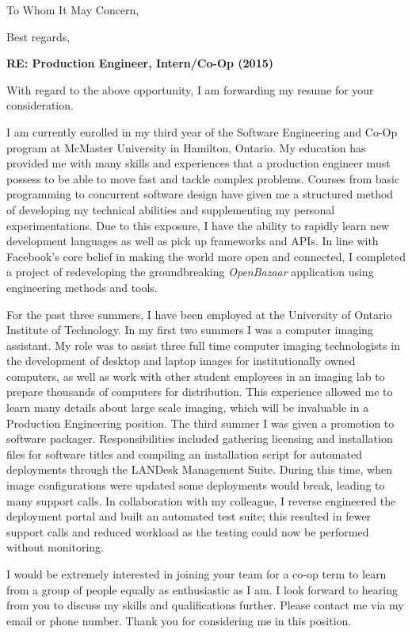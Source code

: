 \documentclass[11pt,a4paper,sans]{moderncv}        %
\begin{document}
\date{January 24th, 2016}
\opening{To Whom It May Concern,}
\closing{Best regards,}
\makelettertitle

\textbf{RE: Production Engineer, Intern/Co-Op (2015)}

\small{
With regard to the above opportunity, I am forwarding my resume for your consideration.

I am currently enrolled in my third year of the Software Engineering and Co-Op program at McMaster University in Hamilton, Ontario. My education has provided me with many skills and experiences that a production engineer must possess to be able to move fast and tackle complex problems. Courses from basic programming to concurrent software design have given me a structured method of developing my technical abilities and supplementing my personal experimentations. Due to this exposure, I have the ability to rapidly learn new development languages as well as pick up frameworks and APIs. In line with Facebook's core belief in making the world more open and connected, I completed a project of redeveloping the groundbreaking \textit{OpenBazaar} application using engineering methods and tools. 

For the past three summers, I have been employed at the University of Ontario Institute of Technology. In my first two summers I was a computer imaging assistant. My role was to assist three full time computer imaging technologists in the development of desktop and laptop images for institutionally owned computers, as well as work with other student employees in an imaging lab to prepare thousands of computers for distribution. This experience allowed me to learn many details about large scale imaging, which will be invaluable in a Production Engineering position. The third summer I was given a promotion to software packager. Responsibilities included gathering licensing and installation files for software titles and compiling an installation script for automated deployments through the LANDesk Management Suite. During this time, when image configurations were updated some deployments would break, leading to many support calls. In collaboration with my colleague, I reverse engineered the deployment portal and built an automated test suite; this resulted in fewer support calls and reduced workload as the testing could now be performed without monitoring.


I would be extremely interested in joining your team for a co-op term to learn from a group of people equally as enthusiastic as I am. I look forward to hearing from you to discuss my skills and qualifications further. Please contact me via my email or phone number. Thank you for considering me in this position.}
\end{document}
